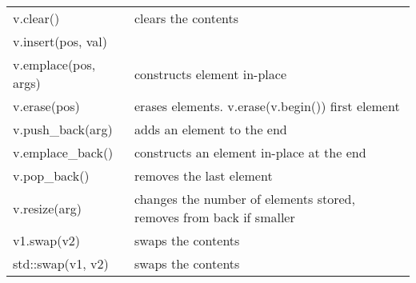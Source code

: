 \begin{center}
\begin{tabularx}{\columnwidth}{ | l  X | }
		v.clear()& clears the contents\\
		
		v.insert(pos, val) &\\
		
		v.emplace(pos, args) & constructs element in-place\\ 
		
		v.erase(pos) & erases elements. v.erase(v.begin()) first element\\
	
		v.push\_back(arg) & adds an element to the end\\
	
		v.emplace\_back() & 	constructs an element in-place at the end\\
		
		v.pop\_back() & removes the last element\\
		
		v.resize(arg) & changes the number of elements stored, removes from back if smaller\\
				
		v1.swap(v2) & swaps the contents \\
		std::swap(v1, v2) & swaps the contents \\
		\hline
	\end{tabularx}
\end{center}